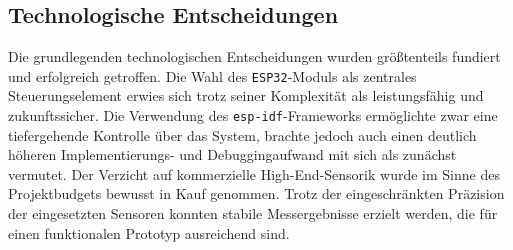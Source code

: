 \subsection*{Technologische Entscheidungen}

Die grundlegenden technologischen Entscheidungen wurden größtenteils fundiert und erfolgreich getroffen. Die Wahl des \texttt{ESP32}-Moduls als zentrales Steuerungselement erwies sich trotz seiner Komplexität als leistungsfähig und zukunftssicher. Die Verwendung des \texttt{esp-idf}-Frameworks ermöglichte zwar eine tiefergehende Kontrolle über das System, brachte jedoch auch einen deutlich höheren Implementierungs- und Debuggingaufwand mit sich als zunächst vermutet. Der Verzicht auf kommerzielle High-End-Sensorik wurde im Sinne des Projektbudgets bewusst in Kauf genommen. Trotz der eingeschränkten Präzision der eingesetzten Sensoren konnten stabile Messergebnisse erzielt werden, die für einen funktionalen Prototyp ausreichend sind.
